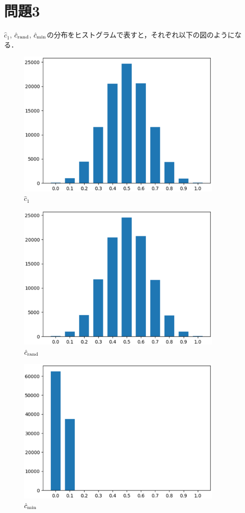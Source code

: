 \section*{問題3}
$\hat{c}_1$, $\hat{c}_{\rm rand}$, $\hat{c}_{\rm min}$の分布をヒストグラムで表すと，それぞれ以下の図のようになる．
\begin{figure}[H]
    \begin{center}
        \includegraphics[width=100mm]{./figures/section_3/c_1.eps}
        \captionsetup{labelformat=empty,labelsep=none}
        \caption{$\hat{c}_1$}
    \end{center}
\end{figure}
\begin{figure}[H]
    \begin{center}
        \includegraphics[width=100mm]{./figures/section_3/c_rand.eps}
        \captionsetup{labelformat=empty,labelsep=none}
        \caption{$\hat{c}_{\rm rand}$}
    \end{center}
\end{figure}
\begin{figure}[H]
    \begin{center}
        \includegraphics[width=100mm]{./figures/section_3/c_min.eps}
        \captionsetup{labelformat=empty,labelsep=none}
        \caption{$\hat{c}_{\rm min}$}
    \end{center}
\end{figure}